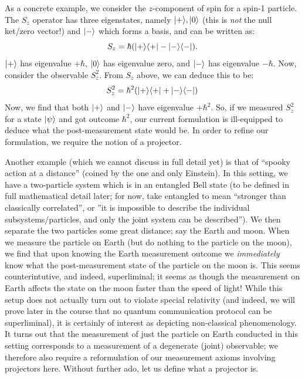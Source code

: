 As a concrete example, we consider the $z$-component of spin for a spin-1 particle. The $S_z$ operator has three eigenstates, namely $\lvert + \rangle, \lvert 0 \rangle$ (this is \emph{not} the null ket/zero vector!) and $\lvert - \rangle$ which forms a basis, and can be written as:
\begin{equation}
    S_z = \hbar(\lvert + \rangle \langle + \rvert - \lvert - \rangle \langle - \rvert).
\end{equation}
$\lvert + \rangle$ has eigenvalue $+\hbar$, $\lvert 0 \rangle$ has eigenvalue zero, and $\lvert - \rangle$ has eigenvalue $-\hbar$. Now, consider the observable $S_z^2$. From $S_z$ above, we can deduce this to be:
\begin{equation}
    S_z^2 = \hbar^2(\lvert + \rangle \langle + \rvert + \lvert - \rangle \langle - \rvert)
\end{equation}
Now, we find that both $\lvert + \rangle$ and $\lvert - \rangle$ have eigenvalue $+\hbar^2$. So, if we measured $S_z^2$ for a state $\lvert \psi \rangle$ and got outcome $\hbar^2$, our current formulation is ill-equipped to deduce what the post-measurement state would be. In order to refine our formulation, we require the notion of a projector.

Another example (which we cannot discuss in full detail yet) is that of ``spooky action at a distance'' (coined by the one and only Einstein). In this setting, we have a two-particle system which is in an entangled Bell state (to be defined in full mathematical detail later; for now, take entangled to mean ``stronger than classically correlated'', or ''it is impossible to describe the individual subsystems/particles, and only the joint system can be described''). We then separate the two particles some great distance; say the Earth and moon. When we measure the particle on Earth (but do nothing to the particle on the moon), we find that upon knowing the Earth measurement outcome we \emph{immediately} know what the post-measurement state of the particle on the moon is. This seems counterintutive, and indeed, superliminal; it seems as though the measurement on Earth affects the state on the moon faster than the speed of light! While this setup does not actually turn out to violate special relativity (and indeed, we will prove later in the course that no quantum communication protocol can be superliminal), it is certainly of interest as depicting non-classical phenomenology. It turns out that the measurement of just the particle on Earth conducted in this setting corresponds to a measurement of a degenerate (joint) observable; we therefore also require a reformulation of our measurement axioms involving projectors here. Without further ado, let us define what a projector is.

